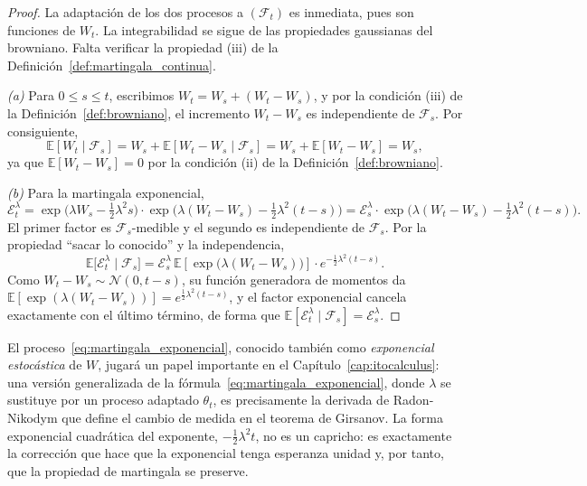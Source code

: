 \documentclass[11pt,a4paper,oneside]{report}
\theoremstyle{plain}
\theoremstyle{definition}
\theoremstyle{remark}
\newcommand{\E}{\mathbb{E}}
\newcommand{\F}{\mathcal{F}}
\newcommand{\1}{\mathbf{1}}
\begin{document}
\begin{proof}
La adaptación de los dos procesos a $(\F_t)$ es inmediata, pues son
funciones de $W_t$. La integrabilidad se sigue de las propiedades
gaussianas del browniano. Falta verificar la propiedad (iii) de la
Definición~\ref{def:martingala_continua}.

\emph{(a)} Para $0 \leq s \leq t$, escribimos $W_t = W_s + (W_t - W_s)$,
y por la condición (iii) de la Definición~\ref{def:browniano}, el
incremento $W_t - W_s$ es independiente de $\F_s$. Por consiguiente,
\begin{equation*}
  \E[W_t \mid \F_s] = W_s + \E[W_t - W_s \mid \F_s]
                    = W_s + \E[W_t - W_s] = W_s,
\end{equation*}
ya que $\E[W_t - W_s] = 0$ por la condición (ii) de la
Definición~\ref{def:browniano}.

\emph{(b)} Para la martingala exponencial,
\begin{equation*}
  \mathcal{E}_t^{\lambda}
  = \exp\!\bigl(\lambda W_s - \tfrac{1}{2}\lambda^2 s\bigr)
    \cdot \exp\!\bigl(\lambda(W_t - W_s) - \tfrac{1}{2}\lambda^2(t - s)\bigr)
  = \mathcal{E}_s^{\lambda} \cdot
    \exp\!\bigl(\lambda(W_t - W_s) - \tfrac{1}{2}\lambda^2(t - s)\bigr).
\end{equation*}
El primer factor es $\F_s$-medible y el segundo es independiente de
$\F_s$. Por la propiedad ``sacar lo conocido'' y la independencia,
\begin{equation*}
  \E\bigl[\mathcal{E}_t^{\lambda} \mid \F_s\bigr]
  = \mathcal{E}_s^{\lambda}\,
    \E\!\left[\exp\!\bigl(\lambda(W_t - W_s)\bigr)\right]
    \cdot e^{-\frac{1}{2}\lambda^2(t-s)}.
\end{equation*}
Como $W_t - W_s \sim \mathcal{N}(0, t-s)$, su función generadora de
momentos da $\E[\exp(\lambda(W_t-W_s))] = e^{\frac{1}{2}\lambda^2(t-s)}$,
y el factor exponencial cancela exactamente con el último término, de forma que $\E[\mathcal{E}_t^{\lambda} \mid \F_s] = \mathcal{E}_s^{\lambda}$.
\end{proof}

El
proceso~\eqref{eq:martingala_exponencial}, conocido también como
\emph{exponencial estocástica} de $W$, jugará un papel importante en el
Capítulo~\ref{cap:itocalculus}: una versión generalizada de la
fórmula~\eqref{eq:martingala_exponencial}, donde $\lambda$ se sustituye
por un proceso adaptado $\theta_t$, es precisamente la derivada de
Radon-Nikodym que define el cambio de medida en el teorema de Girsanov.
La forma exponencial cuadrática del exponente, $-\tfrac{1}{2}\lambda^2
t$, no es un capricho: es exactamente la corrección que hace que la
exponencial tenga esperanza unidad y, por tanto, que la propiedad de
martingala se preserve.
\end{document}
